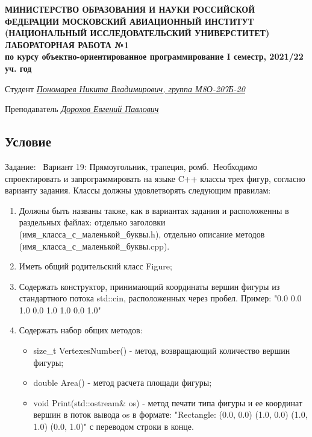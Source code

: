 \documentclass[12pt]{article}
\begin{document}
\begin{titlepage}
\begin{center}
\textbf{МИНИСТЕРСТВО ОБРАЗОВАНИЯ И НАУКИ РОССИЙСКОЙ ФЕДЕРАЦИИ
\medskip
МОСКОВСКИЙ АВИАЦИОННЫЙ ИНСТИТУТ
(НАЦИОНАЛЬНЫЙ ИССЛЕДОВАТЕЛЬСКИЙ УНИВЕРСТИТЕТ)
\vfill\vfill
{\Huge ЛАБОРАТОРНАЯ РАБОТА №1} \\
по курсу объектно-ориентированное программирование
I семестр, 2021/22 уч. год}
\end{center}
\vfill

Студент \uline{\it {Пономарев Никита Владимирович, группа М8О-207Б-20}\hfill}

Преподаватель \uline{\it {Дорохов Евгений Павлович}\hfill}

\vfill
\end{titlepage}

\subsection*{Условие}

Задание: \
Вариант 19: Прямоугольник, трапеция, ромб.\
Необходимо спроектировать и запрограммировать на языке C++ классы трех фигур, согласно варианту задания. Классы должны удовлетворять следующим правилам:
\begin{enumerate}
\item Должны быть названы также, как в вариантах задания и расположенны в раздельных файлах: отдельно заголовки (имя\_класса\_с\_маленькой\_буквы.h), отдельно описание методов (имя\_класса\_с\_маленькой\_буквы.cpp).
\item Иметь общий родительский класс Figure;
\item Содержать конструктор, принимающий координаты вершин фигуры из стандартного потока std::cin, расположенных через пробел. Пример: "0.0 0.0 1.0 0.0 1.0 1.0 0.0 1.0"
\item Содержать набор общих методов:
\begin{itemize}
    \item size\_t VertexesNumber() - метод, возвращающий количество вершин фигуры;
    \item double Area() - метод расчета площади фигуры;
    \item void Print(std::ostream& os) - метод печати типа фигуры и ее координат вершин в поток вывода os в формате: "Rectangle: (0.0, 0.0) (1.0, 0.0) (1.0, 1.0) (0.0, 1.0)" с переводом строки в конце.
\end{itemize}
\end{enumerate}
\end{document}
